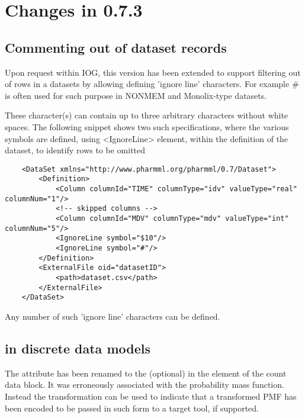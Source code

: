 
\chapter{Changes in 0.7.3}
\label{ch:073changes}

\section{Commenting out of dataset records}
\label{sec:ignore}
Upon request within IOG, this version has been extended 
to support filtering out of rows in a datasets by allowing defining 
'ignore line' characters. For example $\#$ is often used for such 
purpose in NONMEM and Monolix-type datasets. 

These character(s) can contain up to three arbitrary characters 
without white spaces. The following snippet shows two such specifications, 
where the various symbols are defined, using <IgnoreLine> element, 
within the definition of the dataset, to identify rows to be omitted

\lstset{language=XML}
\begin{lstlisting}
    <DataSet xmlns="http://www.pharmml.org/pharmml/0.7/Dataset">
        <Definition>
            <Column columnId="TIME" columnType="idv" valueType="real" columnNum="1"/>
            <!-- skipped columns -->
            <Column columnId="MDV" columnType="mdv" valueType="int" columnNum="5"/>
            <IgnoreLine symbol="$10"/>
            <IgnoreLine symbol="#"/>
        </Definition>
        <ExternalFile oid="datasetID">
            <path>dataset.csv</path>
        </ExternalFile>
    </DataSet>
\end{lstlisting}
Any number of such 'ignore line' characters can be defined.

\section{ in discrete data models}
\label{sec:link}

The  attribute has been renamed to the (optional) 
in the  element of the count data block. It was erroneously associated
with the probability mass function. Instead the transformation can be used to 
indicate that a transformed PMF has been encoded to be passed in such form to
a target tool, if supported. 

